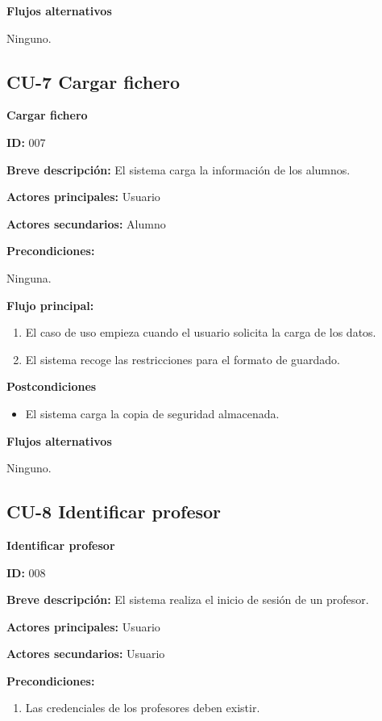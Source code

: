 \textbf{Flujos alternativos}

Ninguno.

\subsection{CU-7 Cargar fichero}
\textbf{Cargar fichero}

\textbf{ID:} 007

\textbf{Breve descripción:} El sistema carga la información de los alumnos.

\textbf{Actores principales:} Usuario

\textbf{Actores secundarios:} Alumno

\textbf{Precondiciones:}

Ninguna.

\textbf{Flujo principal:}

\begin{enumerate}
	\item El caso de uso empieza cuando el usuario solicita la carga de los datos.
	\item El sistema recoge las restricciones para el formato de guardado.
\end{enumerate}

\textbf{Postcondiciones}

\begin{itemize}
	\item El sistema carga la copia de seguridad almacenada.
\end{itemize}

\textbf{Flujos alternativos}

Ninguno.

\subsection{CU-8 Identificar profesor}
\textbf{Identificar profesor}

\textbf{ID:} 008

\textbf{Breve descripción:} El sistema realiza el inicio de sesión de un profesor.

\textbf{Actores principales:} Usuario

\textbf{Actores secundarios:} Usuario

\textbf{Precondiciones:}

\begin{enumerate}
	\item Las credenciales de los profesores deben existir.
\end{enumerate}

